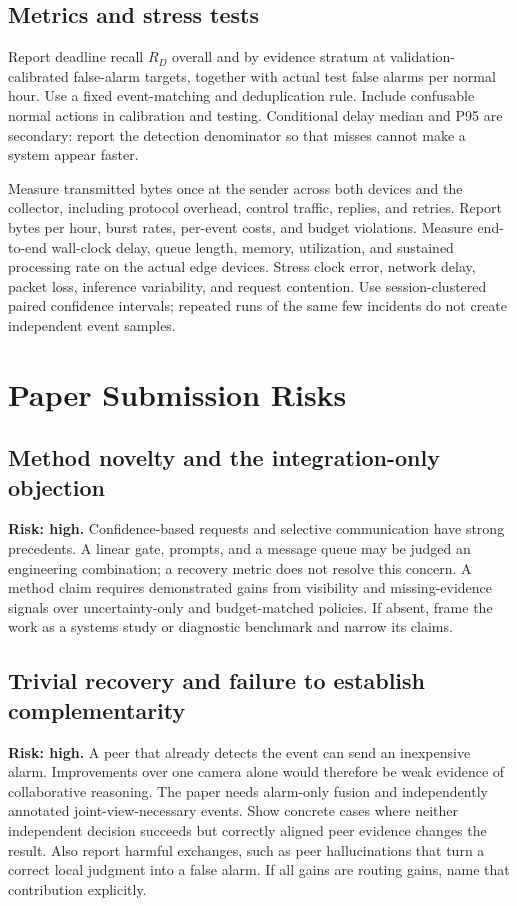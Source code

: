 \documentclass[10pt,a4paper]{article}
\begin{document}
\subsection{Metrics and stress tests}
Report deadline recall $R_D$ overall and by evidence stratum at validation-calibrated false-alarm targets, together with actual test false alarms per normal hour. Use a fixed event-matching and deduplication rule. Include confusable normal actions in calibration and testing. Conditional delay median and P95 are secondary: report the detection denominator so that misses cannot make a system appear faster.

Measure transmitted bytes once at the sender across both devices and the collector, including protocol overhead, control traffic, replies, and retries. Report bytes per hour, burst rates, per-event costs, and budget violations. Measure end-to-end wall-clock delay, queue length, memory, utilization, and sustained processing rate on the actual edge devices. Stress clock error, network delay, packet loss, inference variability, and request contention. Use session-clustered paired confidence intervals; repeated runs of the same few incidents do not create independent event samples.

\newpage
\section{Paper Submission Risks}
\subsection{Method novelty and the integration-only objection}
\textbf{Risk: high.} Confidence-based requests and selective communication have strong precedents. A linear gate, prompts, and a message queue may be judged an engineering combination; a recovery metric does not resolve this concern. A method claim requires demonstrated gains from visibility and missing-evidence signals over uncertainty-only and budget-matched policies. If absent, frame the work as a systems study or diagnostic benchmark and narrow its claims.

\subsection{Trivial recovery and failure to establish complementarity}
\textbf{Risk: high.} A peer that already detects the event can send an inexpensive alarm. Improvements over one camera alone would therefore be weak evidence of collaborative reasoning. The paper needs alarm-only fusion and independently annotated joint-view-necessary events. Show concrete cases where neither independent decision succeeds but correctly aligned peer evidence changes the result. Also report harmful exchanges, such as peer hallucinations that turn a correct local judgment into a false alarm. If all gains are routing gains, name that contribution explicitly.
\end{document}

